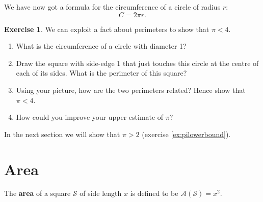 \documentclass[a4paper]{report}
\theoremstyle{definition}
\newtheorem{exercise}[thm]{Exercise}
\newcommand{\df}[1]{\textbf{#1}\index{#1}}
\begin{document}
  We have now got a formula for the circumference of a circle of radius $ r $:
  \begin{equation}
    C = 2\pi r.
  \end{equation}

  \begin{exercise}\label{ex:piupperbound}
    We can exploit a fact about perimeters to show that $ \pi < 4 $.
    \begin{enumerate}
      \item What is the circumference of a circle with diameter 1?
      \item Draw the square with side-edge 1 that just touches this circle at the centre of each
            of its sides. What is the perimeter of this square?
      \item Using your picture, how are the two perimeters related? Hence show that $ \pi < 4 $.
      \item How could you improve your upper estimate of $ \pi $?
    \end{enumerate}
    In the next section we will show that $ \pi > 2 $ (exercise \ref{ex:pilowerbound}).
  \end{exercise}

  \section{Area}
  The \df{area} of a square $ \mathscr{S} $ of side length $ x $ is defined to be $ \mathcal{A}(\mathscr{S}) = x^2 $.
\end{document}
